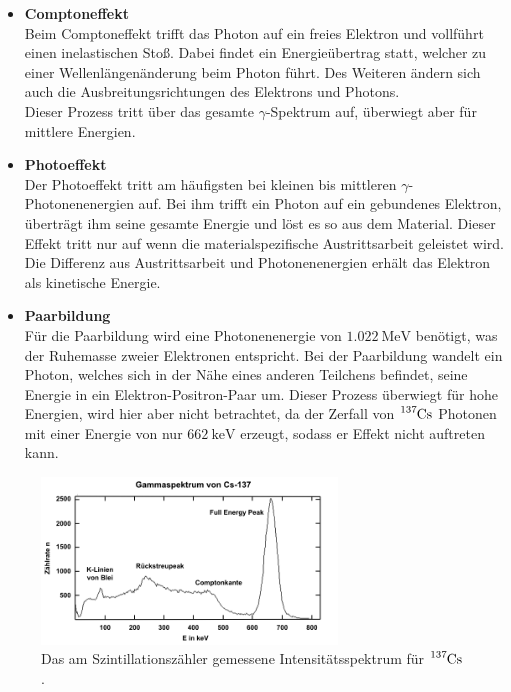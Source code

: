 \noindent
\begin{itemize}
    \item \textbf{Comptoneffekt}\\
        Beim Comptoneffekt trifft das Photon auf ein freies Elektron und vollführt einen inelastischen Stoß. 
        Dabei findet ein Energieübertrag statt, welcher zu einer Wellenlängenänderung beim Photon führt. 
        Des Weiteren ändern sich auch die Ausbreitungsrichtungen des Elektrons und Photons.\\
        Dieser Prozess tritt über das gesamte $\gamma$-Spektrum auf, überwiegt aber für mittlere Energien.
    \item \textbf{Photoeffekt}\\
        Der Photoeffekt tritt am häufigsten bei kleinen bis mittleren $\gamma$-Photonenenergien auf. Bei ihm trifft ein Photon auf ein gebundenes Elektron, 
        überträgt ihm seine gesamte Energie und löst es so aus dem Material. Dieser Effekt tritt nur auf wenn die materialspezifische Austrittsarbeit geleistet wird.
        Die Differenz aus Austrittsarbeit und Photonenenergien erhält das Elektron als kinetische Energie.
    \item \textbf{Paarbildung}\\
        Für die Paarbildung wird eine Photonenenergie von $\SI{1.022}{\mega\electronvolt}$ benötigt, was der Ruhemasse zweier Elektronen entspricht.
        Bei der Paarbildung wandelt ein Photon, welches sich in der Nähe eines anderen Teilchens befindet, seine Energie in ein Elektron-Positron-Paar um.
        Dieser Prozess überwiegt für hohe Energien, wird hier aber nicht betrachtet, da der Zerfall von $\ce{^{137}Cs}$ Photonen mit einer Energie von nur 
        $\SI{662}{\kilo\electronvolt}$ erzeugt, sodass er Effekt nicht auftreten kann.
\end{itemize}


\begin{figure}[H]
    \centering
    \includegraphics[width=0.7\textwidth]{latex/images/Spektrum.PNG}
    \caption{Das am Szintillationszähler gemessene Intensitätsspektrum für $\ce{^{137}Cs}$ \protect \cite{leifi}.}
    \label{img:spek}
\end{figure}


